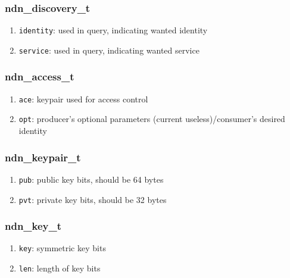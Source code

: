\documentclass[a4paper, 11pt]{article}
\begin{document}
        \subsubsection*{ndn\_discovery\_t}
        \begin{enumerate}
                \item \texttt{identity}: used in query, indicating wanted identity
                \item \texttt{service}: used in query, indicating wanted service
        \end{enumerate}        

        \subsubsection*{ndn\_access\_t}
        \begin{enumerate}
                \item \texttt{ace}: keypair used for access control
                \item \texttt{opt}: producer's optional parameters (current useless)/consumer's desired identity
        \end{enumerate}  

        \subsubsection*{ndn\_keypair\_t}
        \begin{enumerate}
                \item \texttt{pub}: public key bits, should be 64 bytes
                \item \texttt{pvt}: private key bits, should be 32 bytes
        \end{enumerate} 

        \subsubsection*{ndn\_key\_t}
        \begin{enumerate}
                \item \texttt{key}: symmetric key bits
                \item \texttt{len}: length of key bits
        \end{enumerate} 
        
        
        
\end{document}
